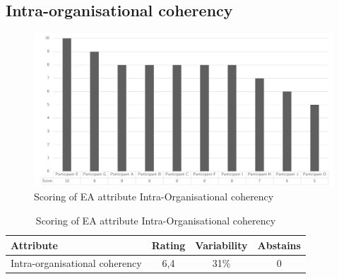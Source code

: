 \subsection{Intra-organisational coherency}
\begin{figure}[h!]
	\centering
	\includegraphics[width=0.9\linewidth]{images/scoreeaintraorganisationalcoherency}
	\caption[Scoring of EA attribute Intra-Organisational coherency]{Scoring of EA attribute Intra-Organisational coherency}
	\label{fig:appscoringeaintraorganisationalcoherency}
\end{figure}
\begin{table}[h!]
	\centering
	\begin{tabular}{p{}ccc}
		\toprule
		\textbf{Attribute} & \textbf{Rating} & \textbf{Variability} & \textbf{Abstains} \\
		\midrule
		Intra-organisational coherency & 6,4 & 31\% & 0 \\%
		\bottomrule
	\end{tabular}%
	\caption[Scoring of EA attribute Intra-Organisational coherency]{Scoring of EA attribute Intra-Organisational coherency}
	\label{tab:appscoringeaintraorganisationalcoherency}%
\end{table}%
\newpage
